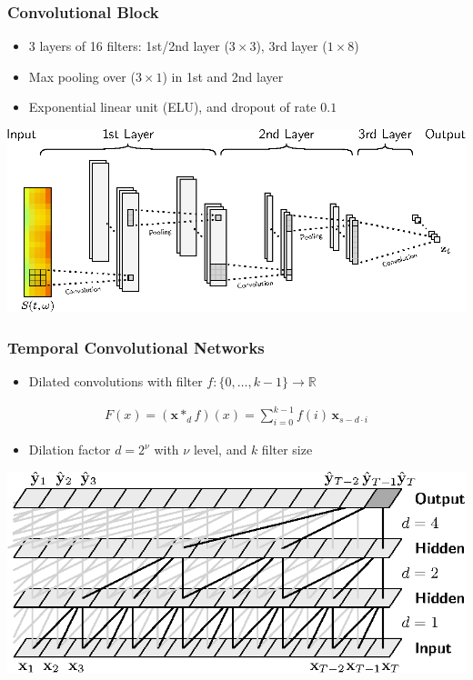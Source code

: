 \documentclass{beamer}
\begin{document}
\begin{frame}
\frametitle{Convolutional Block}
\begin{itemize}
\item 3 layers of 16 filters: 1st/2nd layer ($3\times3$), 3rd layer ($1\times8$)
\item Max pooling over ($3\times1$) in 1st and 2nd layer
\item Exponential linear unit (ELU), and dropout of rate $0.1$
\end{itemize}
\begin{minipage}{\textwidth} 
\centering
\includegraphics[scale=0.9]{figures/conv_block_color.eps}
\end{minipage}

\end{frame}






\begin{frame}
\frametitle{Temporal Convolutional Networks}
\begin{itemize}
\item  Dilated convolutions with filter $f:\{ 0, \dots, k-1\} \rightarrow \mathbb R$
\end{itemize}
\vspace{-0.5em}
\begin{align}
F(x) = (\mathbf x *_d f)(x) = \sum_{i=0}^{k-1} f(i) \, \mathbf x_{s-d\cdot i}
\end{align}
\vspace{-0.5em}
\begin{itemize}
\item Dilation factor $d = 2^\nu$ with $\nu$ level, and $k$ filter size
\end{itemize}
\vspace{1em}
\begin{minipage}{\textwidth} 
\centering
\includegraphics[scale=0.8]{figures/dilated_conv_full.eps}
\end{minipage}

\end{frame}
\end{document}
